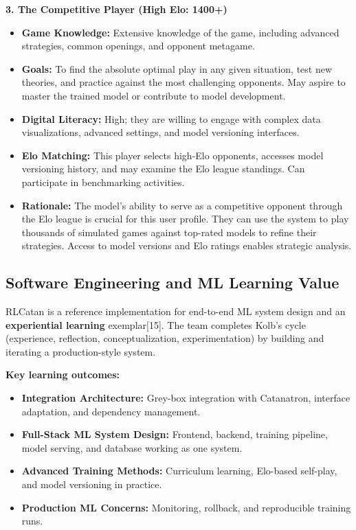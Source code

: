 \documentclass{article}
\begin{document}
\noindent\textbf{3. The Competitive Player (High Elo: 1400+)}
\begin{itemize}
    \item \textbf{Game Knowledge:} Extensive knowledge of the game, including advanced strategies, common openings, and opponent metagame.
    \item \textbf{Goals:} To find the absolute optimal play in any given situation, test new theories, and practice against the most challenging opponents. May aspire to master the trained model or contribute to model development.
    \item \textbf{Digital Literacy:} High; they are willing to engage with complex data visualizations, advanced settings, and model versioning interfaces.
    \item \textbf{Elo Matching:} This player selects high-Elo opponents, accesses model versioning history, and may examine the Elo league standings. Can participate in benchmarking activities.
    \item \textbf{Rationale:} The \AI{} model's ability to serve as a competitive opponent through the Elo league is crucial for this user profile. They can use the system to play thousands of simulated games against top-rated models to refine their strategies. Access to model versions and Elo ratings enables strategic analysis.
\end{itemize}

\subsection{Software Engineering and ML Learning Value}\label{subsec:se-ml-learning}
RLCatan is a reference implementation for end-to-end ML system design and an \textbf{experiential learning} exemplar[15]. The team completes Kolb’s cycle (experience, reflection, conceptualization, experimentation) by building and iterating a production-style system.

\hspace{1cm}

\noindent\textbf{Key learning outcomes:}
\begin{itemize}
    \item \textbf{Integration Architecture:} Grey-box integration with Catanatron, interface adaptation, and dependency management.
    \item \textbf{Full-Stack ML System Design:} Frontend, backend, training pipeline, model serving, and database working as one system.
    \item \textbf{Advanced Training Methods:} Curriculum learning, Elo-based self-play, and model versioning in practice.
    \item \textbf{Production ML Concerns:} Monitoring, rollback, and reproducible training runs.
\end{itemize}
\end{document}
